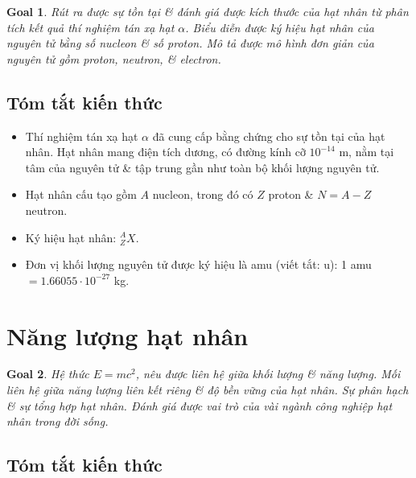 \documentclass{article}
\newtheorem{goal}{Goal}
\begin{document}
\begin{goal}
	Rút ra được sự tồn tại \& đánh giá được kích thước của hạt nhân từ phân tích kết quả thí nghiệm tán xạ hạt $\alpha$. Biểu diễn được ký hiệu hạt nhân của nguyên tử bằng số nucleon \& số proton. Mô tả được mô hình đơn giản của nguyên tử gồm proton, neutron, \& electron.
\end{goal}

\subsection{Tóm tắt kiến thức}

\begin{itemize}
	\item Thí nghiệm tán xạ hạt $\alpha$ đã cung cấp bằng chứng cho sự tồn tại của hạt nhân. Hạt nhân mang điện tích dương, có đường kính cỡ $10^{-14}$ m, nằm tại tâm của nguyên tử \& tập trung gần như toàn bộ khối lượng nguyên tử.
	\item Hạt nhân cấu tạo gồm $A$ nucleon, trong đó có $Z$ proton \& $N = A - Z$ neutron.
	\item Ký hiệu hạt nhân: ${}_Z^AX$.
	\item Đơn vị khối lượng nguyên tử được ký hiệu là amu (viết tắt: u): 1 amu $= 1.66055\cdot10^{-27}$ kg.
\end{itemize}


\section{Năng lượng hạt nhân}

\begin{goal}
	Hệ thức $E = mc^2$, nêu được liên hệ giữa khối lượng \& năng lượng. Mối liên hệ giữa năng lượng liên kết riêng \& độ bền vững của hạt nhân. Sự phân hạch \& sự tổng hợp hạt nhân. Đánh giá được vai trò của vài ngành công nghiệp hạt nhân trong đời sống.
\end{goal}

\subsection{Tóm tắt kiến thức}
\end{document}
